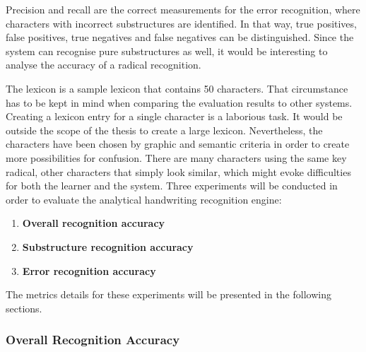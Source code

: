 Precision and recall are the correct measurements for the error recognition,
where characters with incorrect substructures are identified. 
In that way, true positives, false positives, 
true negatives and false negatives can be distinguished.
Since the system can recognise pure substructures as well, it would 
be interesting to analyse the accuracy of a radical recognition.

The lexicon is a sample lexicon that contains 50 characters. That circumstance
has to be kept in mind when comparing the evaluation results to other
systems. Creating a lexicon entry for a single character is a laborious task.
It would be outside the scope of the thesis to create a large lexicon.
Nevertheless, the characters have been chosen by graphic and
semantic criteria in order to create more possibilities for confusion.
There are many characters using the same key radical, other characters
that simply look similar, which might evoke difficulties 
for both the learner and the system.
Three experiments will be conducted in order to evaluate the analytical
handwriting recognition engine:
\begin{enumerate}
  \item \textbf{Overall recognition accuracy} \label{eval:enum:overall}
  \item \textbf{Substructure recognition accuracy} \label{eval:enum:substructure}
  \item \textbf{Error recognition accuracy} \label{eval:enum:errorrecognition}
\end{enumerate}
The metrics details for these experiments will be presented in the following 
sections.

\subsubsection{Overall Recognition Accuracy}
\label{sec:eval:overallrecognitionaccuracy}

